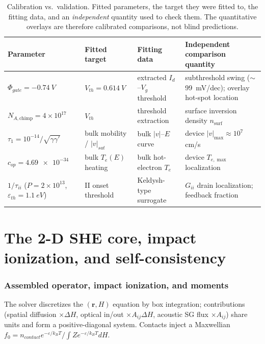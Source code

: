 \documentclass[11pt]{article}
\newcommand{\eps}{\varepsilon}
\newcommand{\vecr}{\mathbf{r}}
\begin{document}
\begin{table}[h]\centering\small
\caption{Calibration vs.\ validation. Fitted parameters, the target they were fitted to, the
fitting data, and an \emph{independent} quantity used to check them. The quantitative overlays are
therefore calibrated comparisons, not blind predictions.}\label{tab:calib}
\begin{tabular}{p{2.7cm}p{2.9cm}p{3.4cm}p{4.4cm}}
\toprule
Parameter & Fitted target & Fitting data & Independent comparison quantity \\
\midrule
$\Phi_{gate}=\SI{-0.74}{V}$ & $V_{th}=\SI{0.614}{V}$ & extracted $I_d$--$V_g$ threshold & subthreshold swing ($\sim$\SI{99}{mV/dec}); overlay hot-spot location \\
$N_{A,\text{chimp}}=4{\times}10^{17}$ & $V_{th}$ & threshold extraction & surface inversion density $n_{\text{surf}}$ \\
$\tau_1=10^{-14}/\!\sqrt{\gamma\gamma'}$ & bulk mobility / $|v|_{sat}$ & bulk $|v|$--$E$ curve & device $|v|_{\max}\approx10^{7}\,$cm/s \\
$c_{op}=\SI{4.69e-34}{}$ & bulk $T_e(E)$ heating & bulk hot-electron $T_e$ & device $T_{e,\max}$ localization \\
$1/\tau_{ii}$ ($P{=}2{\times}10^{13}$, $\eps_{th}{=}\SI{1.1}{eV}$) & II onset threshold & Keldysh-type surrogate & $G_{ii}$ drain localization; feedback fraction \\
\bottomrule
\end{tabular}
\end{table}

\part{The 2-D SHE core, impact ionization, and self-consistency}

\section{Assembled operator, impact ionization, and moments}\label{sec:core}
The solver discretizes the $(\vecr,H)$ equation by box integration; contributions (spatial
diffusion $\times\Delta H$, optical in/out $\times A_{ij}\Delta H$, acoustic SG flux $\times
A_{ij}$) share units and form a positive-diagonal system. Contacts inject a Maxwellian
$f_0=n_{contact}e^{-\eps/k_BT}/\!\int Ze^{-\eps/k_BT}dH$.
\end{document}
